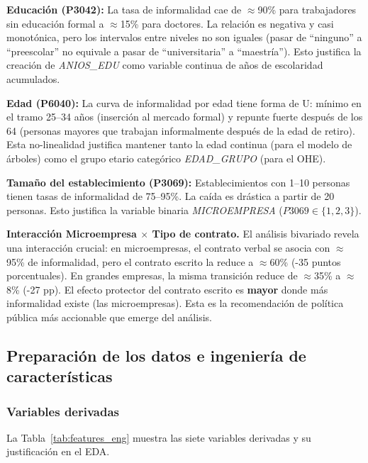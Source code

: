 \documentclass[12pt, a4paper]{article}
\begin{document}
\textbf{Educación (P3042):} La tasa de informalidad cae de $\approx$90\% para trabajadores
sin educación formal a $\approx$15\% para doctores. La relación es negativa y casi
monotónica, pero los intervalos entre niveles no son iguales (pasar de ``ninguno'' a
``preescolar'' no equivale a pasar de ``universitaria'' a ``maestría''). Esto justifica
la creación de \textit{ANIOS\_EDU} como variable continua de años de escolaridad acumulados.

\textbf{Edad (P6040):} La curva de informalidad por edad tiene forma de U: mínimo en el
tramo 25--34 años (inserción al mercado formal) y repunte fuerte después de los 64
(personas mayores que trabajan informalmente después de la edad de retiro). Esta
no-linealidad justifica mantener tanto la edad continua (para el modelo de árboles)
como el grupo etario categórico \textit{EDAD\_GRUPO} (para el OHE).

\textbf{Tamaño del establecimiento (P3069):} Establecimientos con 1--10 personas tienen
tasas de informalidad de 75--95\%. La caída es drástica a partir de 20 personas. Esto
justifica la variable binaria \textit{MICROEMPRESA} ($P3069 \in \{1, 2, 3\}$).

\begin{hallazgo}
\textbf{Interacción Microempresa $\times$ Tipo de contrato.} El análisis bivariado revela
una interacción crucial: en microempresas, el contrato verbal se asocia con $\approx$95\%
de informalidad, pero el contrato escrito la reduce a $\approx$60\% (-35 puntos
porcentuales). En grandes empresas, la misma transición reduce de $\approx$35\% a $\approx$8\%
(-27 pp). El efecto protector del contrato escrito es \textbf{mayor} donde más informalidad
existe (las microempresas). Esta es la recomendación de política pública más accionable
que emerge del análisis.
\end{hallazgo}

\subsection{Preparación de los datos e ingeniería de características}

\subsubsection{Variables derivadas}

La Tabla~\ref{tab:features_eng} muestra las siete variables derivadas y su justificación
en el EDA.
\end{document}
